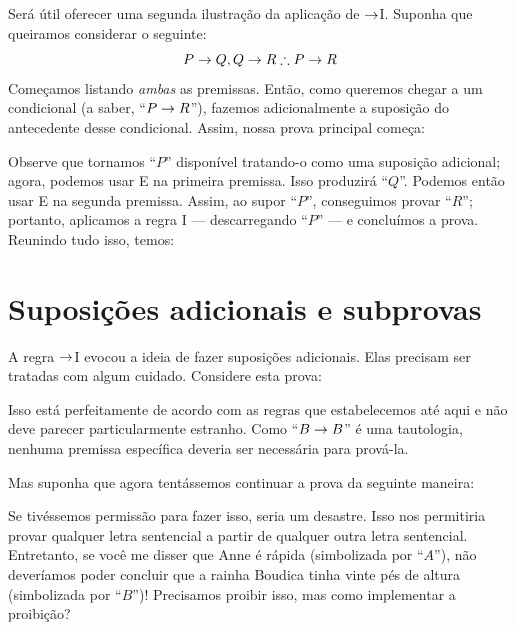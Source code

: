 Será útil oferecer uma segunda ilustração da aplicação de $\rightarrow$I. Suponha que queiramos considerar o seguinte:
	$$P \eif Q, Q \eif R \therefore P \eif R$$
Começamos listando \emph{ambas} as premissas. Então, como queremos chegar a um condicional (a saber, \textquotedblleft$P \rightarrow R$\textquotedblright{}), fazemos adicionalmente a suposição do antecedente desse condicional. Assim, nossa prova principal começa:
\begin{fitchproof}
	\PR
	\PR
	\open
		\AS
	\close
\end{fitchproof}
Observe que tornamos \textquotedblleft$P$\textquotedblright{} disponível tratando-o como uma suposição adicional; agora, podemos usar {\eif}E na primeira premissa. Isso produzirá \textquotedblleft$Q$\textquotedblright{}. Podemos então usar {\eif}E na segunda premissa. Assim, ao supor \textquotedblleft$P$\textquotedblright{}, conseguimos provar \textquotedblleft$R$\textquotedblright{}; portanto, aplicamos a regra {\eif}I — descarregando \textquotedblleft$P$\textquotedblright{} — e concluímos a prova. Reunindo tudo isso, temos:
\label{HSproof}
\begin{fitchproof}
	\PR
	\PR
	\open
		\AS
	\close
\end{fitchproof}


\section{Suposições adicionais e subprovas}
A regra $\rightarrow$I evocou a ideia de fazer suposições adicionais. Elas precisam ser tratadas com algum cuidado. Considere esta prova:
\begin{fitchproof}
	\PR
	\open
		\AS
		 
	\close
\end{fitchproof}
Isso está perfeitamente de acordo com as regras que estabelecemos até aqui e não deve parecer particularmente estranho. Como \textquotedblleft$B \rightarrow B$\textquotedblright{} é uma tautologia, nenhuma premissa específica deveria ser necessária para prová-la.

Mas suponha que agora tentássemos continuar a prova da seguinte maneira:
\begin{fitchproof}
	\PR
	\open
		\AS
		 
	\close
\ifHTMLtarget
	 
\else
	 
	 
\fi
\end{fitchproof}
Se tivéssemos permissão para fazer isso, seria um desastre. Isso nos permitiria provar qualquer letra sentencial a partir de qualquer outra letra sentencial. Entretanto, se você me disser que Anne é rápida (simbolizada por \textquotedblleft$A$\textquotedblright{}), não deveríamos poder concluir que a rainha Boudica tinha vinte pés de altura (simbolizada por \textquotedblleft$B$\textquotedblright{})! Precisamos proibir isso, mas como implementar a proibição?


